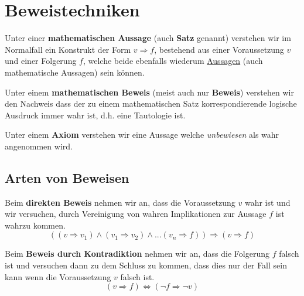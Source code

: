 \documentclass[../../main.tex]{subfiles}
\begin{document}
	
	\chapter{Beweistechniken}
	
	\begin{definition}
		\label{def:MathematischeAussage}
		Unter einer \textbf{mathematischen Aussage} (auch \textbf{Satz} genannt) verstehen wir im Normalfall ein Konstrukt der Form $v \Rightarrow f$, bestehend aus einer Voraussetzung $v$ und einer Folgerung $f$, welche beide ebenfalls wiederum \hyperref[def:Aussage]{Aussagen} (auch mathematische Aussagen) sein können.
	\end{definition}

	\begin{definition}
		\label{def:MathematischerBeweis}
		Unter einem \textbf{mathematischen Beweis} (meist auch nur \textbf{Beweis}) verstehen wir den Nachweis dass der zu einem mathematischen Satz korrespondierende logische Ausdruck immer wahr ist, d.h. eine Tautologie ist.
	\end{definition}

	\begin{definition}[Axiom]
		Unter einem \textbf{Axiom} verstehen wir eine Aussage welche \textit{unbewiesen} als wahr angenommen wird. 
	\end{definition}



	\section{Arten von Beweisen}
	
	\begin{definition}
		Beim \textbf{direkten Beweis} nehmen wir an, dass die Voraussetzung $v$ wahr ist und wir versuchen, durch Vereinigung von wahren Implikationen zur Aussage \dq$f$ ist wahr\dq zu kommen.
		$$((v \Rightarrow v_1) \land (v_1 \Rightarrow v_2) \land ... (v_n \Rightarrow f)) \Rightarrow (v \Rightarrow f)$$
	\end{definition}

	\begin{definition}
		Beim \textbf{Beweis durch Kontradiktion} nehmen wir an, dass die Folgerung $f$ falsch ist und versuchen dann zu dem Schluss zu kommen, dass dies nur der Fall sein kann wenn die Voraussetzung $v$ falsch ist. 
		$$(v \Rightarrow f) \Leftrightarrow (\lnot f \Rightarrow \lnot v)$$
	\end{definition}
\end{document}
